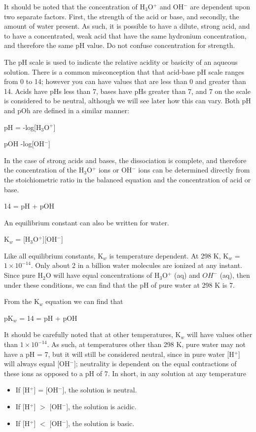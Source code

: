 \documentclass[../chem.tex]{subfiles}
\begin{document}
It should be noted that the concentration of H$_3$O$^+$ and OH$^-$ are dependent upon two separate factors. First, the strength of the acid or base, and 
secondly, the amount of water present. As such, it is possible to have a dilute, strong acid, and to have a concentrated, weak acid that have the same hydronium concentration, and therefore the same pH value. 
Do not confuse concentration for strength.

The pH scale is used to indicate the relative acidity or basicity of an aqueous solution. There is a common misconception that that acid-base 
pH scale ranges from 0 to 14; however you can have values that are less than 0 and greater than 14. Acids have pHs less than 7, bases have pHs greater than 7, 
and 7 on the scale is considered to be neutral, although we will see later how this can vary. Both pH and pOh are defined in a similar manner:
\begin{center}
    pH = -log[H$_3$O$^+$]
\end{center}
\begin{center}
    pOH -log[OH$^-$]
\end{center}

In the case of strong acids and bases, the dissociation is complete, and therefore the concentration of the H$_3$O$^+$ ions or OH$^-$ ions can be 
determined directly from the stoichiometric ratio in the balanced equation and the concentration of acid or base.

\begin{center}
    14 = pH + pOH
\end{center}

An equilibrium constant can also be written for water.
\begin{center}
    K$_w$ = [H$_3$O$^+$][OH$^-$]
\end{center}

Like all equilibrium constants, K$_w$ is temperature dependent. At 298 K, K$_w$ = $1\times 10^{-14}$. Only about 2 in a billion water molecules 
are ionized at any instant. Since pure H$_2$O will have equal concentrations of H$_3$O$^+$ (aq) and $OH^-$ (aq), then under these conditions, we can find that the pH of pure water at 298 K is 7.

From the K$_w$ equation we can find that 
\begin{center}
    pK$_w$ = 14 = pH + pOH 
\end{center}

It should be carefully noted that at other temperatures, K$_w$ will have values other than $1\times 10^{-14}$. As such, at temperatures other than 298 K, pure water 
may not have a pH = 7, but it will still be considered neutral, since in pure water [H$^+$] will always equal [OH$^-$]; neutrality is dependent 
on the equal contractions of these ions as opposed to a pH of 7. In short, in any solution at any temperature 
\begin{itemize}
    \item If [H$^+$] = [OH$^-$], the solution is neutral.
    \item If [H$^+$] $>$ [OH$^-$], the solution is acidic.
    \item If [H$^+$] $<$ [OH$^-$], the solution is basic.
\end{itemize}
\end{document}
